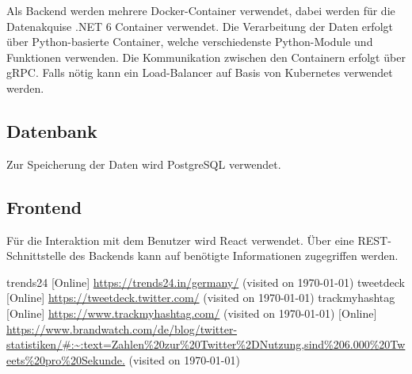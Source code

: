 \documentclass[conference]{IEEEtran}
\begin{document}
Als Backend werden mehrere Docker-Container verwendet, dabei werden für die Datenakquise .NET 6 Container verwendet. Die Verarbeitung der Daten erfolgt über Python-basierte Container, welche verschiedenste Python-Module und Funktionen verwenden.
Die Kommunikation zwischen den Containern erfolgt über gRPC.
Falls nötig kann ein Load-Balancer auf Basis von Kubernetes verwendet werden.

\subsection*{Datenbank}
Zur Speicherung der Daten wird PostgreSQL verwendet.

\subsection*{Frontend}

Für die Interaktion mit dem Benutzer wird React verwendet.
Über eine REST-Schnittstelle des Backends kann auf benötigte Informationen zugegriffen werden.


\begin{thebibliography}{0}
        trends24 [Online] \url{https://trends24.in/germany/} (visited on \today)
        tweetdeck [Online] \url{https://tweetdeck.twitter.com/} (visited on \today)
        trackmyhashtag [Online] \url{https://www.trackmyhashtag.com/} (visited on \today)
         [Online] \url{https://www.brandwatch.com/de/blog/twitter-statistiken/#:~:text=Zahlen%20zur%20Twitter%2DNutzung,sind%206.000%20Tweets%20pro%20Sekunde.} (visited on \today)
\end{thebibliography}
\vspace{12pt}
\end{document}
